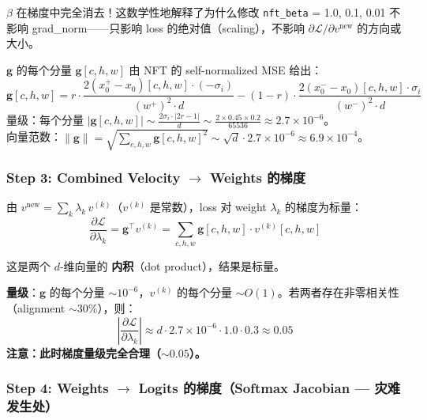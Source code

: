 \documentclass[11pt,a4paper]{article}
\newcommand{\loss}{\mathcal{L}}
\theoremstyle{definition}
\begin{document}
\begin{tcolorbox}[colback=yellow!5, colframe=yellow!60!black, title=关键发现 1: $\beta$ 消去]
$\beta$ 在梯度中完全消去！这数学性地解释了为什么修改 \texttt{nft\_beta} = 1.0, 0.1, 0.01 不影响 grad\_norm——只影响 loss 的绝对值（scaling），不影响 $\partial\loss/\partial v^{\mathrm{new}}$ 的方向或大小。
\end{tcolorbox}

$\mathbf{g}$ 的每个分量 $\mathbf{g}[c,h,w]$ 由 NFT 的 self-normalized MSE 给出：
\begin{equation}
\mathbf{g}[c,h,w] = r \cdot \frac{2(x^+_0 - x_0)[c,h,w] \cdot (-\sigma_i)}{(w^+)^2 \cdot d} - (1-r) \cdot \frac{2(x^-_0 - x_0)[c,h,w] \cdot \sigma_i}{(w^-)^2 \cdot d}
\end{equation}
量级：每个分量 $|\mathbf{g}[c,h,w]| \sim \frac{2\sigma_i \cdot |2r-1|}{d} \sim \frac{2 \times 0.45 \times 0.2}{65536} \approx 2.7 \times 10^{-6}$。\\
向量范数：$\|\mathbf{g}\| = \sqrt{\sum_{c,h,w} \mathbf{g}[c,h,w]^2} \sim \sqrt{d} \cdot 2.7 \times 10^{-6} \approx 6.9 \times 10^{-4}$。

\subsubsection{Step 3: Combined Velocity $\to$ Weights 的梯度}

由 $v^{\mathrm{new}} = \sum_k \lambda_k\, v^{(k)}$（$v^{(k)}$ 是常数），loss 对 weight $\lambda_k$ 的梯度为标量：
\begin{equation}
\frac{\partial \loss}{\partial \lambda_k} = \mathbf{g}^\top v^{(k)} = \sum_{c,h,w} \mathbf{g}[c,h,w] \cdot v^{(k)}[c,h,w]
\label{eq:grad_wrt_lambda}
\end{equation}

这是两个 $d$-维向量的 \textbf{内积}（dot product），结果是标量。

\textbf{量级}：$\mathbf{g}$ 的每个分量 $\sim 10^{-6}$，$v^{(k)}$ 的每个分量 $\sim O(1)$。若两者存在非零相关性（alignment $\sim 30\%$），则：
\begin{equation}
\left|\frac{\partial \loss}{\partial \lambda_k}\right| \approx d \cdot 2.7 \times 10^{-6} \cdot 1.0 \cdot 0.3 \approx 0.05
\end{equation}
\textbf{注意：此时梯度量级完全合理（$\sim 0.05$）。}

\subsubsection{Step 4: Weights $\to$ Logits 的梯度（Softmax Jacobian — 灾难发生处）}
\end{document}
